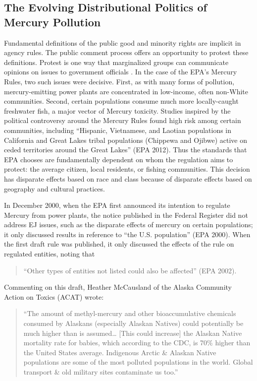 \documentclass[
      12pt,
        ]{article}
\begin{document}
\hypertarget{the-evolving-distributional-politics-of-mercury-pollution}{%
\subsection{The Evolving Distributional Politics of Mercury Pollution}\label{the-evolving-distributional-politics-of-mercury-pollution}}

Fundamental definitions of the public good and minority rights are
implicit in agency rules. The public comment process offers an
opportunity to protest these definitions. Protest is one way that
marginalized groups can communicate opinions on issues to government
officials \citep{Gillion2013}. In the case of the EPA's Mercury Rules, two
such issues were decisive. First, as with many forms of pollution,
mercury-emitting power plants are concentrated in low-income, often
non-White communities. Second, certain populations consume much more
locally-caught freshwater fish, a major vector of Mercury toxicity.
Studies inspired by the political controversy around the Mercury Rules
found high risk among certain communities, including ``Hispanic, Vietnamese, and
Laotian populations in California and Great Lakes tribal populations
(Chippewa and Ojibwe) active on ceded territories around the Great
Lakes'' (EPA 2012). Thus the standards that EPA chooses are fundamentally
dependent on whom the regulation aims to protect: the average citizen,
local residents, or fishing communities. This decision has disparate
effects based on race and class because of disparate effects based on
geography and cultural practices.

In December 2000, when the EPA first announced its intention to regulate
Mercury from power plants, the notice published in the Federal Register
did not address EJ issues, such as the disparate
effects of mercury on certain populations; it only discussed results in
reference to ``the U.S. population'' (EPA 2000). When the first draft rule
was published, it only discussed the effects of the rule on regulated
entities, noting that

\begin{quote}
``Other types of entities not listed could also be
affected'' (EPA 2002).
\end{quote}

Commenting on this draft, Heather McCausland of
the Alaska Community Action on Toxics (ACAT) wrote:

\begin{quote}
``The amount of methyl-mercury and other bioaccumulative chemicals
consumed by Alaskans (especially Alaskan Natives) could potentially be
much higher than is assumed\ldots{} {[}This could increase{]} the Alaskan Native mortality rate for
babies, which according to the CDC, is 70\% higher than the United States
average. Indigenous Arctic \& Alaskan Native populations are some of
the most polluted populations in the world.
Global transport \& old military sites contaminate us too.''
\end{quote}
\end{document}
